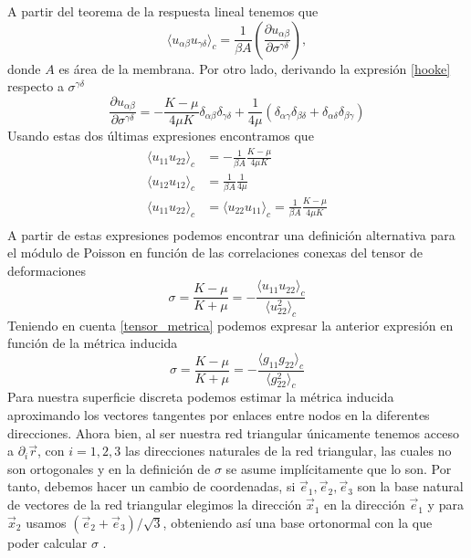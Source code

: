A partir del teorema de la respuesta lineal \cite{Binney:critical_phenomema}
tenemos que
\begin{equation}
\langle u_{\alpha\beta}u_{\gamma\delta} \rangle_c
=\frac{1}{\beta A}\left(\frac{\partial u_{\alpha\beta}}{\partial \sigma^{\gamma\delta}}\right),
\end{equation}
donde $A$ es área de la membrana. Por otro lado, derivando la expresión
\eqref{hooke} respecto a $\sigma^{\gamma\delta}$
\begin{equation}\frac{\partial u_{\alpha\beta}}{\partial
  \sigma^{\gamma\delta}}=-\frac{K-\mu}{4\mu K}\delta_{\alpha\beta}\delta_{\gamma\delta}+\frac{1}{4\mu}(\delta_{\alpha\gamma}\delta_{\beta\delta}+\delta_{\alpha\delta}\delta_{\beta\gamma})
\end{equation}
Usando estas dos últimas expresiones encontramos que 
\begin{align}
\langle u_{11}u_{22} \rangle_c&=-\frac{1}{\beta A}\frac{K-\mu}{4\mu K}\\
\langle u_{12}u_{12} \rangle_c&=\frac{1}{\beta A}\frac{1}{4\mu}\\
\langle u_{11}u_{22} \rangle_c&=\langle u_{22}u_{11} \rangle_c=\frac{1}{\beta
  A}\frac{K-\mu}{4\mu K}\\
\end{align}
A partir de estas expresiones podemos encontrar una definición alternativa
para el módulo de Poisson \cite{Zang_Dmolecular}\cite{Parrinello_Crystal} en
función de las correlaciones conexas del tensor 
de deformaciones
\begin{equation}
\sigma=\frac{K-\mu}{K+\mu}=-\frac{\langle u_{11}u_{22}
  \rangle_c}{\langle u_{22}^2 \rangle_c}
\end{equation}
Teniendo en cuenta \eqref{tensor_metrica} podemos expresar la anterior
expresión en función de la métrica inducida 
\begin{equation}
\sigma=\frac{K-\mu}{K+\mu}=-\frac{\langle g_{11}g_{22}
  \rangle_c}{\langle g_{22}^2 \rangle_c}
\end{equation}
Para nuestra superficie discreta podemos estimar la métrica inducida
aproximando los vectores tangentes por enlaces entre nodos en la diferentes
direcciones. Ahora bien, al ser nuestra red triangular únicamente tenemos acceso a
$\partial_i \vec{r}$, con $i=1,2,3$ las direcciones naturales de la red
triangular, las cuales no son ortogonales y en la definición de $\sigma$ se
asume implícitamente que lo son. Por tanto, debemos hacer un cambio de coordenadas, si
$\vec{e}_1,\vec{e}_2,\vec{e}_3$ son la base natural de vectores de la red
triangular elegimos la dirección $\vec{x}_1$ en la dirección $\vec{e}_1$ y
para $\vec{x}_2$ usamos $(\vec{e}_2+\vec{e}_3)/\sqrt{3}$, obteniendo así una
base ortonormal con la que poder calcular $\sigma$ \cite{Bowick_poisson_ratio}.

